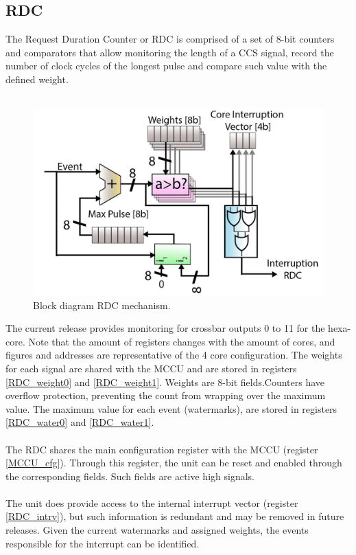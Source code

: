 \subsection{RDC}
The Request Duration Counter or RDC is comprised of a set of 8-bit counters and comparators that allow monitoring the length of a CCS signal, record the number of clock cycles of the longest pulse and compare such value with the defined weight.\\
\\
\begin{figure}[H]
	\begin{center}
	\includegraphics[keepaspectratio,scale=0.15]{img/bd_RDC.png}
	\caption{Block diagram RDC mechanism.}
	\label{fig:blk_RDC}
	\end{center}
\end{figure}

The current release provides monitoring for crossbar outputs 0 to 11 for the hexa-core. Note that the amount of registers changes with the amount of cores, and figures and addresses are representative of the 4 core configuration. The weights for each signal are shared with the MCCU and are stored in registers \ref{RDC_weight0} and \ref{RDC_weight1}. Weights are 8-bit fields.Counters have overflow protection, preventing the count from wrapping over the maximum value.  The maximum value for each event (watermarks), are stored in registers \ref{RDC_water0} and \ref{RDC_water1}.\\
\\
The RDC shares the main configuration register with the MCCU (register \ref{MCCU_cfg}). Through this register, the unit can be reset and enabled through the corresponding fields. Such fields are active high signals. \\
\\
The unit does provide access to the internal interrupt vector (register \ref{RDC_intrv}), but such information is redundant and may be removed in future releases. Given the current watermarks and assigned weights, the events responsible for the interrupt can be identified.  


